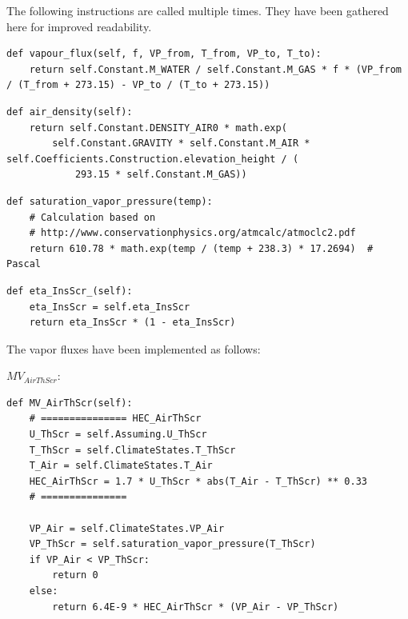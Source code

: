 \documentclass[a4paper]{article}
\numberwithin{equation}{section}
\begin{document}
The following instructions are called multiple times.
They have been gathered here for improved readability.
\begin{mdframed}[leftline=false,rightline=false,backgroundcolor=magenta!10,nobreak=true]
  \begin{verbatim}
def vapour_flux(self, f, VP_from, T_from, VP_to, T_to):
    return self.Constant.M_WATER / self.Constant.M_GAS * f * (VP_from / (T_from + 273.15) - VP_to / (T_to + 273.15))
  \end{verbatim}
\end{mdframed}
\begin{mdframed}[leftline=false,rightline=false,backgroundcolor=magenta!10,nobreak=true]
  \begin{verbatim}
def air_density(self):
    return self.Constant.DENSITY_AIR0 * math.exp(
        self.Constant.GRAVITY * self.Constant.M_AIR * self.Coefficients.Construction.elevation_height / (
            293.15 * self.Constant.M_GAS))
  \end{verbatim}
\end{mdframed}
\begin{mdframed}[leftline=false,rightline=false,backgroundcolor=magenta!10,nobreak=true]
  \begin{verbatim}
def saturation_vapor_pressure(temp):
    # Calculation based on
    # http://www.conservationphysics.org/atmcalc/atmoclc2.pdf
    return 610.78 * math.exp(temp / (temp + 238.3) * 17.2694)  # Pascal
  \end{verbatim}
\end{mdframed}
\begin{mdframed}[leftline=false,rightline=false,backgroundcolor=magenta!10,nobreak=true]
  \begin{verbatim}
def eta_InsScr_(self):
    eta_InsScr = self.eta_InsScr
    return eta_InsScr * (1 - eta_InsScr)
  \end{verbatim}
\end{mdframed}


The vapor fluxes have been implemented as follows:

\(MV_{AirThScr}\):
\begin{mdframed}[leftline=false,rightline=false,backgroundcolor=magenta!10,nobreak=true]
  \begin{verbatim}
def MV_AirThScr(self):
    # =============== HEC_AirThScr
    U_ThScr = self.Assuming.U_ThScr
    T_ThScr = self.ClimateStates.T_ThScr
    T_Air = self.ClimateStates.T_Air
    HEC_AirThScr = 1.7 * U_ThScr * abs(T_Air - T_ThScr) ** 0.33
    # ===============

    VP_Air = self.ClimateStates.VP_Air
    VP_ThScr = self.saturation_vapor_pressure(T_ThScr)
    if VP_Air < VP_ThScr:
        return 0
    else:
        return 6.4E-9 * HEC_AirThScr * (VP_Air - VP_ThScr)
  \end{verbatim}
\end{mdframed}
\end{document}
